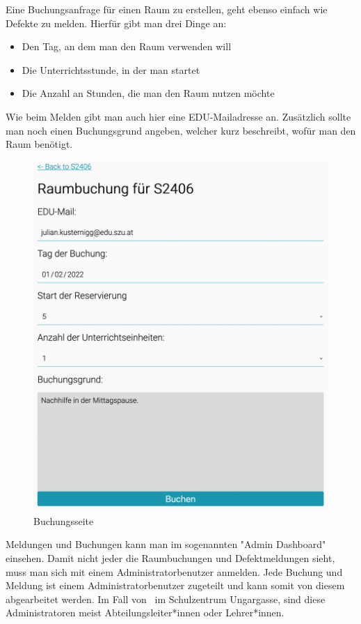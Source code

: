 Eine Buchungsanfrage für einen Raum zu erstellen, geht ebenso einfach wie Defekte zu melden. Hierfür gibt man drei Dinge an: 
\begin{itemize}
    \item Den Tag, an dem man den Raum verwenden will
    \item Die Unterrichtsstunde, in der man startet
    \item Die Anzahl an Stunden, die man den Raum nutzen möchte
\end{itemize} 
Wie beim Melden gibt man auch hier eine EDU-Mailadresse an. Zusätzlich sollte man noch einen Buchungsgrund angeben, welcher kurz beschreibt, wofür man den Raum benötigt.

\begin{figure}[H]
    \centering
    \includegraphics[width=120mm]{media/WebComponents/Buchungsseite_light.png}
    \caption{Buchungsseite}
\end{figure}


\label{sec:webcomplogdash}

Meldungen und Buchungen kann man im sogenannten "Admin Dashboard" einsehen. Damit nicht jeder die Raumbuchungen und Defektmeldungen sieht, muss man sich mit einem Administratorbenutzer anmelden. Jede Buchung und Meldung ist einem Administratorbenutzer zugeteilt und kann somit von diesem abgearbeitet werden. Im Fall von \ZELIA\ im Schulzentrum Ungargasse, sind diese Administratoren meist Abteilungsleiter*innen oder Lehrer*innen.


